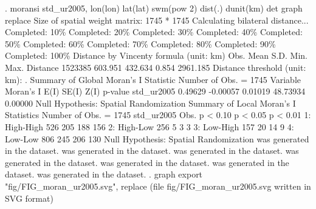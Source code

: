 . moransi std_ur2005, lon(lon) lat(lat) swm(pow 2) dist(.) dunit(km) det graph replace
{\smallskip}
Size of spatial weight matrix: 1745 * 1745
Calculating bilateral distance...
{\TOPT}
{\VBAR}Completed:  10\%{\VBAR}
{\VBAR}Completed:  20\%{\VBAR}
{\VBAR}Completed:  30\%{\VBAR}
{\VBAR}Completed:  40\%{\VBAR}
{\VBAR}Completed:  50\%{\VBAR}
{\VBAR}Completed:  60\%{\VBAR}
{\VBAR}Completed:  70\%{\VBAR}
{\VBAR}Completed:  80\%{\VBAR}
{\VBAR}Completed:  90\%{\VBAR}
{\VBAR}Completed: 100\%{\VBAR}
{\BOTT}
{\smallskip}
Distance by Vincenty formula (unit: km)
                     {\VBAR}        Obs.        Mean         S.D.         Min.         Max.
            Distance {\VBAR}     1523385     603.951      432.634        0.854     2961.185
Distance threshold (unit: km):     .
{\smallskip}
{\smallskip}
Summary of Global Moran's I Statistic                      Number of Obs. =      1745
            Variable {\VBAR}  Moran's I         E(I)        SE(I)         Z(I)      p-value
          std_ur2005 {\VBAR}    0.49629     -0.00057      0.01019     48.73934      0.00000
Null Hypothesis: Spatial Randomization
{\smallskip}
{\smallskip}
Summary of Local Moran's I Statistics                      Number of Obs. =      1745
          std_ur2005 {\VBAR}           Obs.        p < 0.10        p < 0.05        p < 0.01
        1: High-High {\VBAR}            526             205             188             156
        2: High-Low  {\VBAR}            256               5               3               3
        3: Low-High  {\VBAR}            157              20              14               9
        4: Low-Low   {\VBAR}            806             245             206             130
Null Hypothesis: Spatial Randomization
{\smallskip}
{} was generated in the dataset.
{} was generated in the dataset.
{} was generated in the dataset.
{} was generated in the dataset.
{} was generated in the dataset.
{} was generated in the dataset.
{} was generated in the dataset.
{\smallskip}
. graph export "fig/FIG_moran_ur2005.svg", replace
(file fig/FIG_moran_ur2005.svg written in SVG format)
